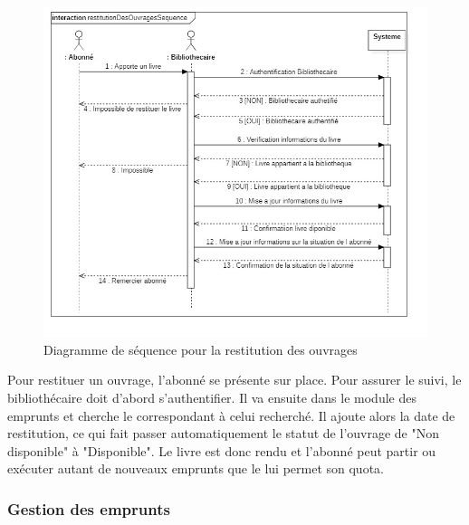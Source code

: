 \paragraph{}
\begin{figure}[h]
        \centering
        \includegraphics[width=1\textwidth]{restitutionDesOuvragesSequence}
        \caption{Diagramme de séquence pour la restitution des ouvrages}
        \label{image-restitutionDesOuvragesSequence}
        \end{figure}
\par
Pour restituer un ouvrage, l'abonné se présente sur place. Pour assurer le suivi, le 
bibliothécaire doit d'abord s'authentifier. Il va ensuite dans le module des emprunts 
et cherche le correspondant à celui recherché. Il ajoute alors la date de restitution,
ce qui fait passer automatiquement le statut de l'ouvrage de "Non disponible" à "Disponible".
Le livre est donc rendu et l'abonné peut partir ou exécuter autant de nouveaux emprunts
que le lui permet son quota.
\subsubsection{Gestion des emprunts} 
